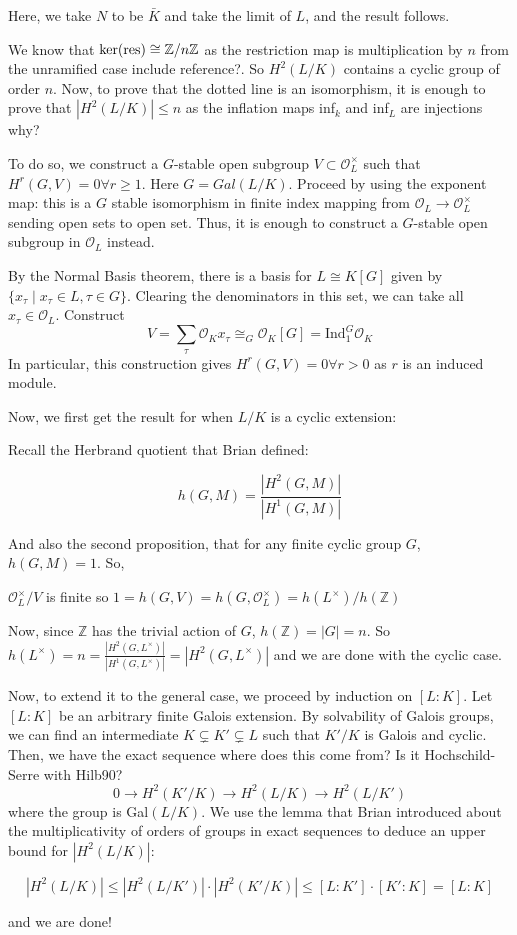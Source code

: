 \documentclass[class=article, crop=false]{standalone}
\begin{document}
Here, we take $N$ to be $\bar{K}$ and take the limit of $L$, and the result follows. 

We know that \(\ker(\text{res}) \cong \mathbb{Z} / n\mathbb{Z}\) 
as the restriction map is multiplication by \(n\) from the
unramified case {\color{red} include reference?}.
So $H^2(L/K)$ contains a cyclic group of order $n$.
Now, to prove that the dotted line is an isomorphism, 
it is enough to prove that 
$|H^2(L/K)|\leq n$ as the inflation maps 
inf$_k$ and inf$_L$ are injections {\color{red} why?}

To do so, we construct a $G$-stable open subgroup $V\subset \mathcal{O}_L^\times$ such that $H^r(G, V)=0\forall r\geq 1$. Here $G=Gal(L/K).$ Proceed by using the exponent map: this is a $G$ stable isomorphism in finite index mapping from $\mathcal{O}_L\rightarrow\mathcal{O}_L^\times$ sending open sets to open set. Thus, it is enough to construct a $G$-stable open subgroup in $\mathcal{O}_L$ instead. 

By the Normal Basis theorem, there is a basis for $L\cong K[G]$ given by $\{x_\tau \mid x_\tau\in L, \tau\in G\}$. Clearing the denominators in this set, we can take all $x_\tau\in \mathcal{O}_L$. Construct $$V=\sum_\tau \mathcal{O}_Kx_\tau\cong_G\mathcal{O}_K[G]=\text{Ind}_1^G\mathcal{O}_K$$ 
In particular, this construction gives $H^r(G,V)=0\forall r>0$ as $r$ is an induced module. 

Now, we first get the result for when $L/K$ is a cyclic extension: 

Recall the Herbrand quotient that Brian defined:

$$h(G,M)=\frac{|H^2(G,M)|}{|H^1(G,M)|}$$

And also the second proposition, that for any finite cyclic group $G$, $h(G,M)=1$. So,

$\mathcal{O}_L^\times/V$ is finite so $1=h(G, V)=h(G, \mathcal{O}_L^\times)=h(L^\times)/h(\mathbb{Z})$

Now, since $\mathbb{Z}$ has the trivial action of $G$, $h(\mathbb{Z})=|G|=n$. So $h(L^\times)=n=\frac{|H^2(G,L^\times)|}{|H^1(G,L^\times)|}=|H^2(G,L^\times)|$ and we are done with the cyclic case. 

Now, to extend it to the general case, we proceed by induction on $[L:K]$. Let $[L:K]$ be an arbitrary finite Galois extension. By solvability of Galois groups, we can find an intermediate $K\subsetneq K'\subsetneq L$ such that $K'/K$ is Galois and cyclic. 
Then, we have the exact sequence 
{\color{red} where does this come from? 
Is it Hochschild-Serre with Hilb90?}
$$0\rightarrow H^2(K'/K)\rightarrow H^2(L/K)\rightarrow H^2(L/K')$$ 
where the group is Gal$(L/K)$. We use the lemma that Brian introduced about the multiplicativity of orders of groups in exact sequences to deduce an upper bound for $|H^2(L/K)|:$


$$|H^2(L/K)|\leq |H^2(L/K')|\cdot|H^2(K'/K)|\leq [L:K']\cdot[K':K]=[L:K]$$

and we are done!
\end{document}
